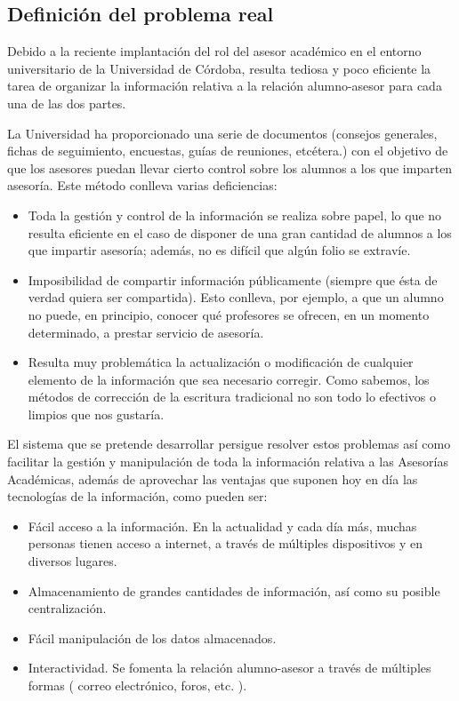 \subsection{Definición del problema real}

Debido a la reciente implantación del rol del asesor académico en el entorno
universitario de la Universidad de Córdoba, resulta tediosa y poco eficiente la
tarea de organizar la información relativa a la relación alumno-asesor para
cada una de las dos partes.

La Universidad ha proporcionado una serie de documentos (consejos
generales, fichas de seguimiento, encuestas, guías de reuniones, etcétera.) con
el objetivo de que los asesores puedan llevar cierto control sobre los alumnos
a los que imparten asesoría. Este método conlleva varias deficiencias:

\begin{itemize}
 \item Toda la gestión y control de la información se realiza sobre papel, lo
       que no resulta eficiente en el caso de disponer de una gran cantidad de
       alumnos a los que impartir asesoría; además, no es difícil que algún
       folio se extravíe.
 \item Imposibilidad de compartir información públicamente (siempre que ésta
       de verdad quiera ser compartida). Esto conlleva, por ejemplo, a que un
       alumno no puede, en principio, conocer qué profesores se ofrecen, en un
       momento determinado, a prestar servicio de asesoría.
 \item Resulta muy problemática la actualización o modificación de cualquier
       elemento de la información que sea necesario corregir. Como sabemos, los
       métodos de corrección de la escritura tradicional no son todo lo
       efectivos o limpios que nos gustaría.
\end{itemize}

El sistema que se pretende desarrollar persigue resolver estos problemas así
como facilitar la gestión y manipulación de toda la información relativa a
las Asesorías Académicas, además de aprovechar las ventajas que suponen hoy en
día las tecnologías de la información, como pueden ser:

\begin{itemize}
 \item Fácil acceso a la información. En la actualidad y cada día más, muchas
       personas tienen acceso a internet, a través de múltiples dispositivos y
       en diversos lugares.
 \item Almacenamiento de grandes cantidades de información, así como su posible
       centralización.
 \item Fácil manipulación de los datos almacenados.
 \item Interactividad. Se fomenta la relación alumno-asesor a través de
       múltiples formas ( correo electrónico, foros, etc. ).
\end{itemize}

